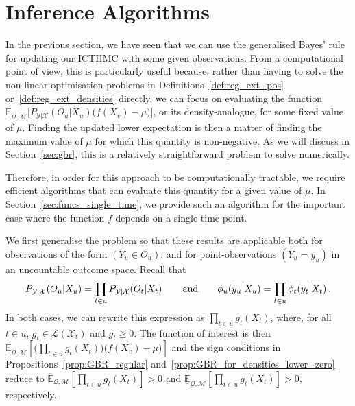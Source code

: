 \documentclass[twoside,11pt]{article}
\newcommand{\states}{\mathcal{X}}
\newcommand{\observs}{\mathcal{Y}}
\newcommand{\lexp}{\underline{\mathbb{E}}_{\rateset,\mathcal{M}}}
\newcommand{\uexp}{\overline{\mathbb{E}}_{\rateset,\mathcal{M}}}
\newcommand{\gambles}{\mathcal{L}}
\newcommand{\rateset}{\mathcal{Q}}
\begin{document}
\section{Inference Algorithms}\label{sec:inference_algos}

In the previous section, we have seen that we can use the generalised Bayes' rule for updating our ICTHMC with some given observations. From a computational point of view, this is particularly useful because, rather than having to solve the non-linear optimisation problems %
in Definitions~\ref{def:reg_ext_pos} or~\ref{def:reg_ext_densities} directly, 
we can focus on evaluating the function $\lexp\bigl[P_{\observs\vert\states}(O_u\vert X_u)\bigl(f(X_v) - \mu\bigr)\bigr]$,
or its density-analogue, for some fixed value of $\mu$. Finding the updated lower expectation is then a matter of finding the maximum value of $\mu$ for which this quantity is non-negative. As we will discuss in Section~\ref{sec:gbr}, this is a relatively straightforward problem to solve numerically.

Therefore, in order for this approach to be computationally tractable, we require efficient algorithms that can evaluate this quantity for a given value of $\mu$. In Section~\ref{sec:funcs_single_time}, we provide such an algorithm for the important case where the function $f$ depends on a single time-point.

We first generalise the problem so that these results are applicable both for observations of the form $(Y_u\in O_u)$, and for point-observations $(Y_u=y_u)$ in an uncountable outcome space. Recall that%
\begin{equation*}
P_{\observs\vert\states}(O_u\vert X_u) = \prod_{t\in u}P_{\observs\vert\states}(O_{t}\vert X_{t})\,\quad\quad\text{and}\quad\quad \phi_u(y_u\vert X_u) = \prod_{t\in u}\phi_{t}(y_{t}\vert X_{t})\,.\vspace{-5pt}
\end{equation*}
In both cases, we can rewrite this expression as $\prod_{t\in u}g_{t}(X_{t})$, where, for all $t\in u$, $g_{t}\in\gambles(\states_{t})$ and $g_{t}\geq 0$. The function of interest is then
$\lexp\left[ \bigl(\prod_{t\in u}g_{t}(X_{t})\bigr)\bigl(f(X_v) - \mu\bigr) \right]$ and the sign conditions in Propositions~\ref{prop:GBR_regular} and~\ref{prop:GBR_for_densities_lower_zero} reduce to $\uexp[\prod_{t\in u} g_{t}(X_{t})]>0$ and $\lexp[\prod_{t\in u} g_{t}(X_{t})]>0$, respectively.
\end{document}
